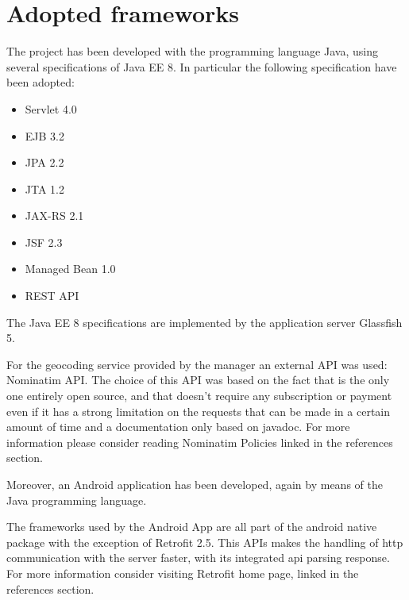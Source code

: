 
\section{Adopted frameworks}

The project has been developed with the programming language Java, using several specifications of Java EE 8.
In particular the following specification have been adopted:

\begin{itemize}
\item Servlet 4.0
\item EJB 3.2
\item JPA 2.2
\item JTA 1.2
\item JAX-RS 2.1
\item JSF 2.3
\item Managed Bean 1.0
\item REST API
\end{itemize}
The Java EE 8 specifications are implemented by the application server Glassfish 5.

For the geocoding service provided by the manager an external API was used: Nominatim API. 
The choice of this API was based on the fact that is the only one entirely open source, and that doesn't require any subscription or payment even if it has a strong limitation on the requests that can be made in a certain amount of time and a documentation only based on javadoc.
For more information please consider reading Nominatim Policies linked in the references section.

Moreover, an Android application has been developed, again by means of the Java programming language.

The frameworks used by the Android App are all part of the android native package with the exception of Retrofit 2.5. This APIs makes the handling of http communication with the server faster, with its integrated api parsing response. 
For more information consider visiting Retrofit home page, linked in the references section.
